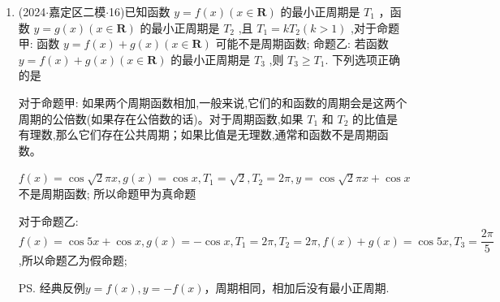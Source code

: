 \begin{enumerate}
\begin{jieda}
        对于命题  ，若$(x_0, y_0) \in \Omega$，则$(-x_0, -y_0) \notin \Omega$，若$(x_0, y_0) \notin \Omega$，则$(-x_0, -y_0) \in \Omega$，其图形面积应为$\dfrac{\pi^2}{2}$
    \end{jieda}

    \item (2024$\cdot$嘉定区二模$\cdot$16)已知函数 $y = f\left( x\right) \left( {x \in  \mathbf{R}}\right)$ 的最小正周期是 ${T}_{1}$ ，函数 $y = g\left( x\right) \left( {x \in  \mathbf{R}}\right)$ 的最小正周期是 ${T}_{2}$ ,且 ${T}_{1} = k{T}_{2}\left( {k > 1}\right)$ ,对于命题甲: 函数 $y = f\left( x\right)  + g\left( x\right) \left( {x \in  \mathbf{R}}\right)$ 可能不是周期函数; 命题乙: 若函数 $y = f\left( x\right)  + g\left( x\right) \left( {x \in  \mathbf{R}}\right)$ 的最小正周期是 ${T}_{3}$ ,则 ${T}_{3} \geq  {T}_{1}$. 下列选项正确的是 
    \begin{jieda}
        对于命题甲: 如果两个周期函数相加,一般来说,它们的和函数的周期会是这两个周期的公倍数(如果存在公倍数的话)。对于周期函数,如果 ${T}_{1}$ 和 ${T}_{2}$ 的比值是有理数,那么它们存在公共周期；如果比值是无理数,通常和函数不是周期函数。
        
        $f\left( x\right)  = \cos \sqrt{2}{\pi x},g\left( x\right)  = \cos x,{T}_{1} =  \sqrt{2},{T}_{2} = {2\pi },y = \cos \sqrt{2}{\pi x} + \cos x$ 不是周期函数; 所以命题甲为真命题
        
        对于命题乙: $f\left( x\right)  = \cos {5x} + \cos x,g\left( x\right)  =  - \cos x,{T}_{1} = {2\pi },{T}_{2} = {2\pi },f\left( x\right)  + g\left( x\right)  = \cos {5x},{T}_{3} = \dfrac{2\pi }{5}$ ,所以命题乙为假命题;

        \ps 经典反例$y = f(x), y = -f(x)$，周期相同，相加后没有最小正周期.
    \end{jieda}
\end{enumerate}
